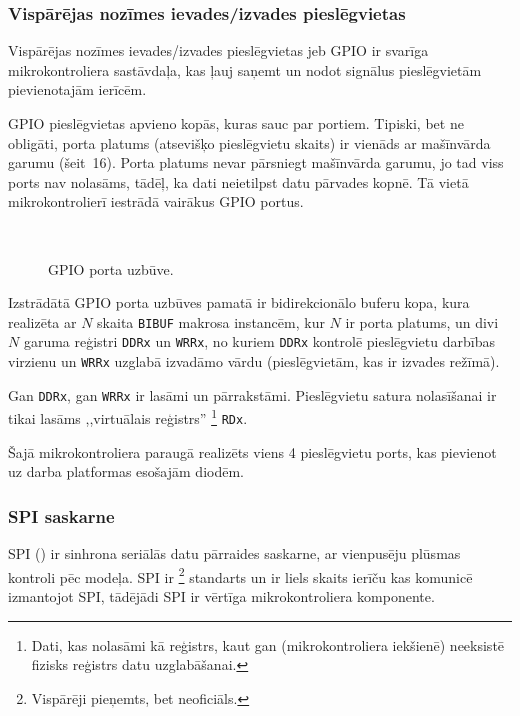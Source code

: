 	\subsubsection{Vispārējas nozīmes ievades/izvades pieslēgvietas}
		Vispārējas nozīmes ievades/izvades pieslēgvietas jeb GPIO ir svarīga
		mikrokontroliera sastāvdaļa, kas ļauj saņemt un nodot signālus
		pieslēgvietām pievienotajām ierīcēm.
		
		GPIO pieslēgvietas apvieno kopās, kuras sauc par portiem. Tipiski, bet
		ne obligāti, porta platums (atsevišķo pieslēgvietu skaits) ir vienāds
		ar mašīnvārda garumu (šeit~16). Porta platums nevar pārsniegt
		mašīnvārda garumu, jo tad viss ports nav nolasāms, tādēļ, ka dati
		neietilpst datu pārvades kopnē. Tā vietā mikrokontrolierī iestrādā
		vairākus GPIO portus.
		
		\begin{figure}[th]
			\centering
			\def\svgwidth{0.9\textwidth}
			{\ttfamily\footnotesize}\\
			\caption{GPIO porta uzbūve.}
			\label{fig:gpio}
		\end{figure}
		
		Izstrādātā GPIO porta uzbūves pamatā ir
		bidirekcionālo buferu kopa, kura realizēta ar $N$ skaita
		\texttt{BIBUF} makrosa instancēm, kur $N$ ir porta platums,
		un divi $N$ garuma reģistri \texttt{DDRx} un \texttt{WRRx},
		no kuriem \texttt{DDRx} kontrolē pieslēgvietu darbības virzienu un
		\texttt{WRRx} uzglabā izvadāmo vārdu (pieslēgvietām, kas ir izvades režīmā).
		
		Gan \texttt{DDRx}, gan \texttt{WRRx} ir lasāmi un pārrakstāmi.
		Pieslēgvietu satura nolasīšanai ir tikai lasāms ,,virtuālais reģistrs''%
		\footnote{Dati, kas nolasāmi kā reģistrs, kaut gan (mikrokontroliera iekšienē)
			neeksistē fizisks reģistrs datu uzglabāšanai.}
		\texttt{RDx}.
	
	Šajā mikrokontroliera paraugā realizēts viens 4 pieslēgvietu ports, kas
	pievienot uz darba platformas esošajām diodēm.
	
	\clearpage %
	\subsubsection{SPI saskarne} \label{sec:spi}
		SPI () ir sinhrona seriālās
		datu pārraides saskarne, ar vienpusēju plūsmas kontroli pēc
		 modeļa.
		SPI ir %
		\footnote{Vispārēji pieņemts, bet neoficiāls.}
		standarts un ir liels skaits ierīču kas komunicē izmantojot SPI,
		tādējādi SPI ir vērtīga mikrokontroliera komponente.
		
